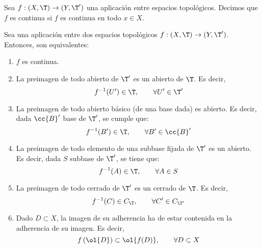 \begin{definicion} Sea $f:(X,\T)\to (Y,\T')$ una aplicación entre espacios topológicos. Decimos que $f$ es continua si $f$ es continua en todo $x\in X$.
\end{definicion}

\begin{prop}\label{prop:Caract_ContinuidadGlobal}
    Sea una aplicación entre dos espacios topológicos $f:(X,\T)\to (Y,\T')$. Entonces, son equivalentes:
    \begin{enumerate}
        \item $f$ es continua.
        \item La preimagen de todo abierto de $\T'$ es un abierto de $\T$. Es decir,
        \begin{equation*}
            f^{-1}(U')\in \T, \qquad \forall U'\in \T'
        \end{equation*}
        \item La preimagen de todo abierto básico (de una base dada) es abierto. Es decir, dada $\cc{B}'$ base de $\T'$, se cumple que:
        \begin{equation*}
            f^{-1}(B')\in \T, \qquad \forall B'\in \cc{B}'
        \end{equation*}

        \item La preimagen de todo elemento de una subbase fijada de $\T'$ es un abierto. Es decir, dada $S$ subbase de $\T'$, se tiene que:
        \begin{equation*}
            f^{-1}(A)\in \T, \qquad \forall A\in S
        \end{equation*}

        \item La preimagen de todo cerrado de $\T'$ es un cerrado de $\T$. Es decir,
        \begin{equation*}
            f^{-1}(C)\in C_\T, \qquad \forall C'\in C_{\T'}
        \end{equation*}

        \item Dado $D\subset X$, la imagen de su adherencia ha de estar contenida en la adherencia de su imagen. Es decir,
        \begin{equation*}
            f\left(\ol{D}\right)\subset \ol{f(D)},\qquad \forall D\subset X
        \end{equation*}
    \end{enumerate}
\end{prop}
